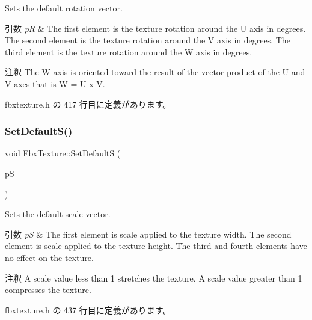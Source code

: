Sets the default rotation vector. 
\begin{DoxyParams}{引数}
{\em pR} & The first element is the texture rotation around the U axis in degrees. The second element is the texture rotation around the V axis in degrees. The third element is the texture rotation around the W axis in degrees. \\
\hline
\end{DoxyParams}
\begin{DoxyRemark}{注釈}
The W axis is oriented toward the result of the vector product of the U and V axes that is W = U x V. 
\end{DoxyRemark}


 fbxtexture.\+h の 417 行目に定義があります。

\mbox{\label{class_fbx_texture_ae7a6ee36439e0117cdd3bc6e198df50c}} 
\subsubsection{\texorpdfstring{Set\+Default\+S()}{SetDefaultS()}}
{\footnotesize\ttfamily void Fbx\+Texture\+::\+Set\+DefaultS (\begin{DoxyParamCaption}\item[{const \hyperlink{class_fbx_vector4}{Fbx\+Vector4} \&}]{pS }\end{DoxyParamCaption})\hspace{0.3cm}{\ttfamily [inline]}}

Sets the default scale vector. 
\begin{DoxyParams}{引数}
{\em pS} & The first element is scale applied to the texture width. The second element is scale applied to the texture height. The third and fourth elements have no effect on the texture. \\
\hline
\end{DoxyParams}
\begin{DoxyRemark}{注釈}
A scale value less than 1 stretches the texture. A scale value greater than 1 compresses the texture. 
\end{DoxyRemark}


 fbxtexture.\+h の 437 行目に定義があります。

\mbox{\label{class_fbx_texture_a6ae1a89cc64792069f8623e88463c0c2}} 
